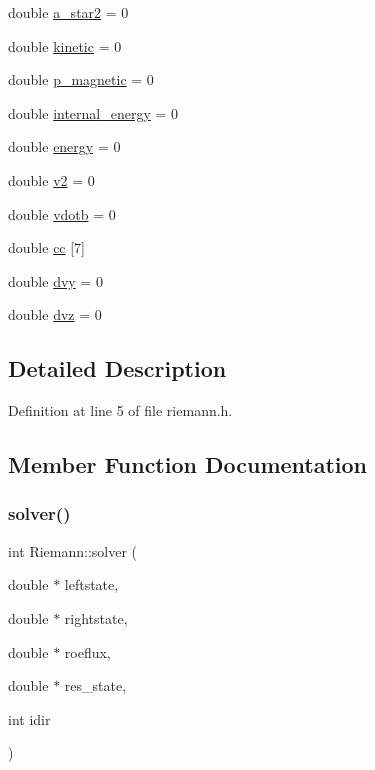 \begin{DoxyCompactItemize}
\item 
double \hyperlink{classRiemann_a743ea6480b351511ce62ac4161bcaadc}{a\+\_\+star2} = 0
\item 
double \hyperlink{classRiemann_a90e80239e22cc2fa3bc2924fadb27001}{kinetic} = 0
\item 
double \hyperlink{classRiemann_ae942c6053a769d20c4adfd20781b3173}{p\+\_\+magnetic} = 0
\item 
double \hyperlink{classRiemann_a4db4bb758058ec35523e82c67042869d}{internal\+\_\+energy} = 0
\item 
double \hyperlink{classRiemann_a970f6cf189521abd99aa533591c3bf91}{energy} = 0
\item 
double \hyperlink{classRiemann_a4ceda02ed2bdd7e95a9c9f928888adeb}{v2} = 0
\item 
double \hyperlink{classRiemann_ac4b46c77d0006ae00dbe7d388f77adef}{vdotb} = 0
\item 
double \hyperlink{classRiemann_af41d4b339856cbe04f5d50284821a027}{cc} \mbox{[}7\mbox{]}
\item 
double \hyperlink{classRiemann_a49d6107d6ceae20cb49257d6e69068d2}{dvy} = 0
\item 
double \hyperlink{classRiemann_aa8ab20be9a3ff9fbf8b9941112da8ca7}{dvz} = 0
\end{DoxyCompactItemize}


\subsection{Detailed Description}


Definition at line 5 of file riemann.\+h.



\subsection{Member Function Documentation}
\mbox{\label{classRiemann_ac605a365149f83e6c27c3d5980d2e42f}} 
\subsubsection{\texorpdfstring{solver()}{solver()}}
{\footnotesize\ttfamily int Riemann\+::solver (\begin{DoxyParamCaption}\item[{double $\ast$}]{leftstate,  }\item[{double $\ast$}]{rightstate,  }\item[{double $\ast$}]{roeflux,  }\item[{double $\ast$}]{res\+\_\+state,  }\item[{int}]{idir }\end{DoxyParamCaption})}



